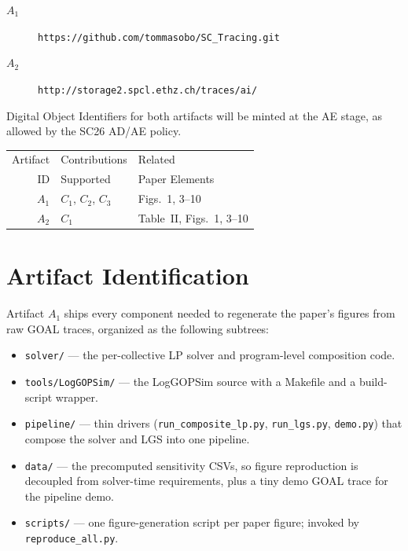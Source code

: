 \documentclass[conference]{IEEEtran}
\begin{document}
\begin{description}
\item[$A_1$] \texttt{https://github.com/tommasobo/\allowbreak SC\_Tracing.git}
\item[$A_2$] \texttt{http://storage2.spcl.ethz.ch/\allowbreak traces/ai/}
\end{description}

Digital Object Identifiers for both artifacts will be minted at
the AE stage, as allowed by the SC26 AD/AE policy.

\begin{center}
\small
\begin{tabular}{rll}
\toprule
Artifact & Contributions &  Related \\
ID       & Supported     &  Paper Elements \\
\midrule
$A_1$   &  $C_1$, $C_2$, $C_3$ & Figs.\ 1, 3--10 \\
\midrule
$A_2$   &  $C_1$               & Table~II, Figs.\ 1, 3--10 \\
\bottomrule
\end{tabular}
\end{center}


\section{Artifact Identification}

\newartifact

\artrel

Artifact $A_1$ ships every component needed to regenerate the
paper's figures from raw GOAL traces, organized as the following
subtrees:

\begin{itemize}
\item \texttt{solver/} --- the per-collective LP solver and
  program-level composition code.
\item \texttt{tools/LogGOPSim/} --- the LogGOPSim source with a
  Makefile and a build-script wrapper.
\item \texttt{pipeline/} --- thin drivers (\texttt{run\_composite\_lp.py},
  \texttt{run\_lgs.py}, \texttt{demo.py}) that compose the solver
  and LGS into one pipeline.
\item \texttt{data/} --- the precomputed sensitivity CSVs, so
  figure reproduction is decoupled from solver-time requirements,
  plus a tiny demo GOAL trace for the pipeline demo.
\item \texttt{scripts/} --- one figure-generation script per
  paper figure; invoked by \texttt{reproduce\_all.py}.
\end{itemize}
\end{document}
